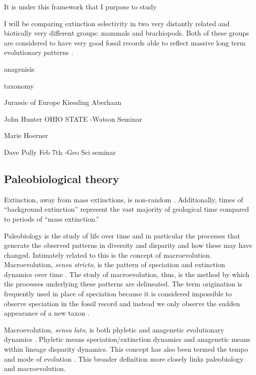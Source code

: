 \documentclass[12pt,letterpaper]{article}
\begin{document}
It is under this framework that I purpose to study

I will be comparing extinction selectivity in two very distantly related and biotically very different groups: mammals and brachiopods. Both of these groups are considered to have very good fossil records able to reflect massive long term evolutionary patterns \citep{Mark1977}.

anagenisis

taxonomy

Jurassic of Europe Kiessling Aberhaan

John Hunter OHIO STATE
-Watson Seminar

Marie Hoerner

Dave Polly Feb 7th
-Geo Sci seminar




\subsection{Paleobiological theory}

Extinction, away from mass extinctions, is non-random \citep{Jablonski1986}. Additionally, times of ``background extinction'' represent the vast majority of geological time compared to periods of ``mass extinction.''

Paleobiology is the study of life over time and in particular the processes that generate the observed patterns in diversity and disparity and how these may have changed.  %
Intimately related to this is the concept of macroevolution. Macroevolution, \textit{sensu stricto}, is the pattern of speciation and extinction dynamics over time \citep{Jablonski2008a}. The study of macroevolution, thus, is the method by which the processes underlying these patterns are delineated. The term origination is frequently used in place of speciation because it is considered impossible to observe speciation in the fossil record and instead we only observe the sudden appearance of a new taxon \citep{Coyne2004}.

Macroevolution, \textit{sensu lato}, is both phyletic and anagenetic evolutionary dynamics \citep{Foote2007b}. Phyletic means speciation/extinction dynamics and anagenetic means within lineage disparity dynamics. This concept has also been termed the tempo and mode of evolution \citep{Simpson1944}. This broader definition more closely links paleobiology and macroevolution.
\end{document}
